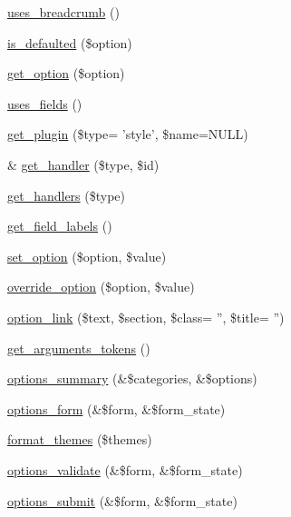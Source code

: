 \begin{DoxyCompactItemize}
\item 
\hyperlink{classviews__plugin__display_ab3d2779948700bcc6c5ee3b26726f468}{uses\_\-breadcrumb} ()
\item 
\hyperlink{classviews__plugin__display_a8f5676603ce803078ea100a5781bfbd6}{is\_\-defaulted} (\$option)
\item 
\hyperlink{classviews__plugin__display_ad2a856f65cb78867204d4f7f877b2972}{get\_\-option} (\$option)
\item 
\hyperlink{classviews__plugin__display_a2476af1c5eb02a69a5a94d0e2f391987}{uses\_\-fields} ()
\item 
\hyperlink{classviews__plugin__display_a7a38d9a80eed86c5c00f7d66002fbf8d}{get\_\-plugin} (\$type= 'style', \$name=NULL)
\item 
\& \hyperlink{classviews__plugin__display_af76b2461cd87d7965a442bae077aa772}{get\_\-handler} (\$type, \$id)
\item 
\hyperlink{classviews__plugin__display_a8ca4ff604c846359bfce009a75a264be}{get\_\-handlers} (\$type)
\item 
\hyperlink{classviews__plugin__display_aa519531ff1725cb9211c04cc9cfc3679}{get\_\-field\_\-labels} ()
\item 
\hyperlink{classviews__plugin__display_a5a0689b3004e556b51b054062a8467c6}{set\_\-option} (\$option, \$value)
\item 
\hyperlink{classviews__plugin__display_a1f5eb1e77d0e8754f0ae0e8092cc2190}{override\_\-option} (\$option, \$value)
\item 
\hyperlink{classviews__plugin__display_a56c8b43b4f8605d40c23b7e573a185e0}{option\_\-link} (\$text, \$section, \$class= '', \$title= '')
\item 
\hyperlink{classviews__plugin__display_a8e1d0e6c3e44801ae060218c1241c7bc}{get\_\-arguments\_\-tokens} ()
\item 
\hyperlink{classviews__plugin__display_a7a2f2aeedfc14816815e3ce65a61aedf}{options\_\-summary} (\&\$categories, \&\$options)
\item 
\hyperlink{classviews__plugin__display_ad9c69d91ea1165ff51dcd1f1f6d3a154}{options\_\-form} (\&\$form, \&\$form\_\-state)
\item 
\hyperlink{classviews__plugin__display_a4f8fbb2ff9dd0f00e31a265334d840e0}{format\_\-themes} (\$themes)
\item 
\hyperlink{classviews__plugin__display_a0b4336df4db25dec552de8d20141a9f5}{options\_\-validate} (\&\$form, \&\$form\_\-state)
\item 
\hyperlink{classviews__plugin__display_a75f0b2d5587b365640fcb4d414daae36}{options\_\-submit} (\&\$form, \&\$form\_\-state)

\end{DoxyCompactItemize}
